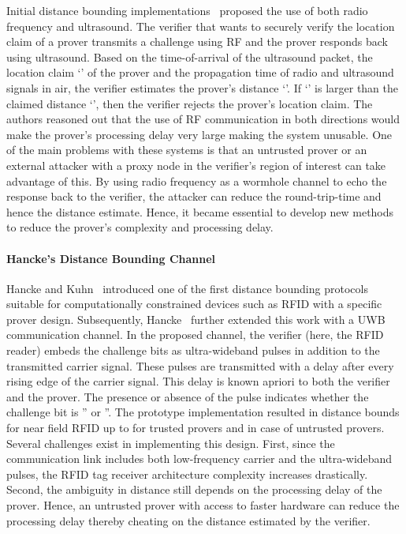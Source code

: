 \documentclass{sig-alternate-10pt}
\begin{document}
Initial distance bounding implementations~\cite{SastrySep03,RasmussenOct08}
proposed the use of both radio frequency and ultrasound. The verifier that wants
to securely verify the location claim of a prover transmits a challenge using RF
and the prover responds back using ultrasound. Based on the time-of-arrival of
the ultrasound packet, the location claim `' of the prover and the
propagation time of radio and ultrasound signals in air, the verifier estimates
the prover's distance `'. If `' is larger than the claimed distance `',
then the verifier rejects the prover's location claim. The authors reasoned out
that the use of RF communication in both directions would make the prover's
processing delay very large making the system unusable. One of the main problems
with these systems is that an untrusted prover or an external attacker with a
proxy node in the verifier's region of interest can take advantage of this. By
using radio frequency as a wormhole channel to echo the response back to the
verifier, the attacker can reduce the round-trip-time and hence the distance
estimate. Hence, it became essential to develop new methods to reduce the
prover's complexity and processing delay.


\paragraph{Hancke's Distance Bounding Channel} Hancke and
Kuhn~\cite{HanckeSep05} introduced one of the first distance bounding protocols
suitable for computationally constrained devices such as RFID with a specific
prover design. Subsequently, Hancke~\cite{HanckeMay11} further extended this
work with a UWB communication channel. In the proposed channel, the verifier
(here, the RFID reader) embeds the challenge bits as ultra-wideband pulses in
addition to the transmitted carrier signal. These pulses are transmitted with a
delay after every rising edge of the carrier signal. This delay is known apriori
to both the verifier and the prover. The presence or absence of the pulse
indicates whether the challenge bit is '' or ''. The prototype
implementation resulted in distance bounds for near field RFID up to 
for trusted provers and  in case of untrusted provers. Several
challenges exist in implementing this design. First, since the communication
link includes both low-frequency carrier and the ultra-wideband pulses, the RFID
tag receiver architecture complexity increases drastically. Second, the
ambiguity in distance still depends on the processing delay of the prover.
Hence, an untrusted prover with access to faster hardware can reduce the
processing delay thereby cheating on the distance estimated by the verifier.
\end{document}
